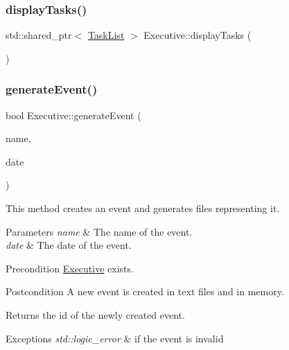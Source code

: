 \subsubsection{\texorpdfstring{display\+Tasks()}{displayTasks()}}
{\footnotesize\ttfamily std\+::shared\+\_\+ptr$<$ \mbox{\hyperlink{class_task_list}{Task\+List}} $>$ Executive\+::display\+Tasks (\begin{DoxyParamCaption}{ }\end{DoxyParamCaption})}

\mbox{\label{class_executive_a0b1e894fc41ed42482896aff46a7a520}} 
\subsubsection{\texorpdfstring{generate\+Event()}{generateEvent()}}
{\footnotesize\ttfamily bool Executive\+::generate\+Event (\begin{DoxyParamCaption}\item[{std\+::string}]{name,  }\item[{std\+::string}]{date }\end{DoxyParamCaption})}

This method creates an event and generates files representing it. 
\begin{DoxyParams}{Parameters}
{\em name} & The name of the event. \\
\hline
{\em date} & The date of the event. \\
\hline
\end{DoxyParams}
\begin{DoxyPrecond}{Precondition}
\mbox{\hyperlink{class_executive}{Executive}} exists. 
\end{DoxyPrecond}
\begin{DoxyPostcond}{Postcondition}
A new event is created in text files and in memory. 
\end{DoxyPostcond}
\begin{DoxyReturn}{Returns}
the id of the newly created event. 
\end{DoxyReturn}

\begin{DoxyExceptions}{Exceptions}
{\em std\+::logic\+\_\+error} & if the event is invalid \\
\hline
\end{DoxyExceptions}
\mbox{\label{class_executive_a68f603b8cdd1bc53a2e0565677f71f4e}} 
